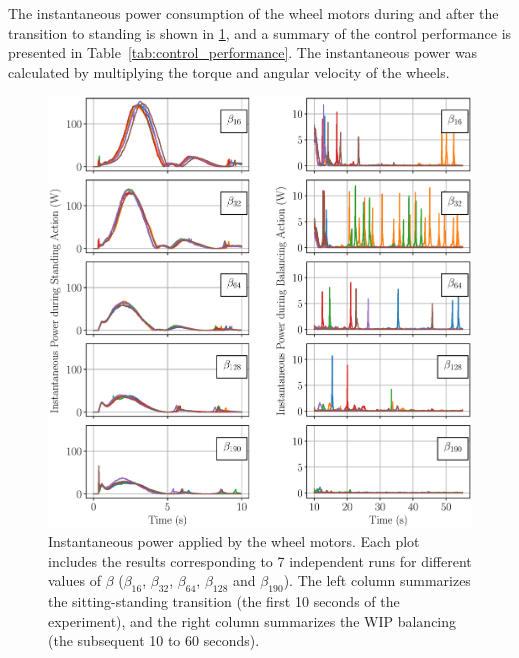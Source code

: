 \documentclass[letterpaper, 10 pt, conference]{ieeeconf}
\begin{document}
The instantaneous power consumption of the wheel motors during and after the
transition to standing is shown in \cref{fig:betas_comparison}, and a summary of
the control performance is presented in Table~\ref{tab:control_performance}.
The instantaneous power was calculated by multiplying the torque and angular
velocity of the wheels.

\begin{figure}[h]
\centering
\includegraphics[width = 0.99\columnwidth]{figs/dualColumn.eps}
\vspace{-1.5\baselineskip}
\caption{\label{fig:betas_comparison} Instantaneous power applied by the wheel
motors.  Each plot includes the results corresponding to 7 independent runs for
different values of $\beta$ ($\beta_{16}$, $\beta_{32}$, $\beta_{64}$,
$\beta_{128}$ and $\beta_{190}$). The left column summarizes the
sitting-standing transition (the first 10 seconds of the experiment), and the
right column summarizes the \ac{WIP} balancing (the subsequent 10 to 60
seconds).}
\end{figure}
\end{document}
